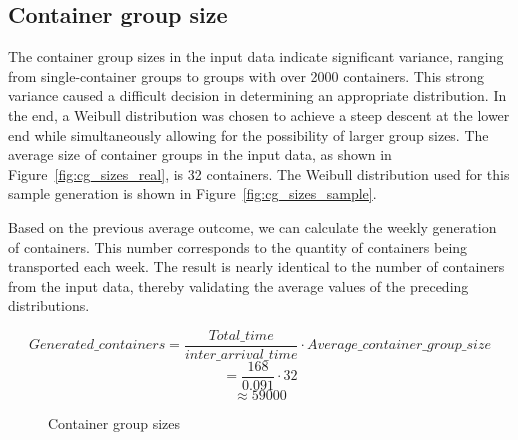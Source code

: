 \documentclass{article}
\begin{document}
\subsection{Container group size}
The container group sizes in the input data indicate significant variance,
ranging from single-container groups to groups with over 2000 containers. This
strong variance caused a difficult decision in determining an appropriate
distribution. In the end, a Weibull distribution was chosen to achieve a steep
descent at the lower end while simultaneously allowing for the possibility of
larger group sizes. The average size of container groups in the input data, as
shown in Figure~\ref{fig:cg_sizes_real}, is 32 containers. The Weibull
distribution used for this sample generation is shown in
Figure~\ref{fig:cg_sizes_sample}.

Based on the previous average outcome, we can calculate the weekly generation
of containers. This number corresponds to the quantity of containers being
transported each week. The result is nearly identical to the number of
containers from the input data, thereby validating the average values of the
preceding distributions.

\begin{equation}
    Generated\_containers = \frac{Total\_time}{inter\_arrival\_time} \cdot Average\_container\_group\_size \end{equation}
\begin{equation} = \frac{168}{0.091} \cdot 32 \end{equation}
\begin{equation} \approx 59000 \end{equation}

\begin{figure}[!tbp]
    \centering
    \hfill
    \caption{Container group sizes}
\end{figure}
\end{document}
